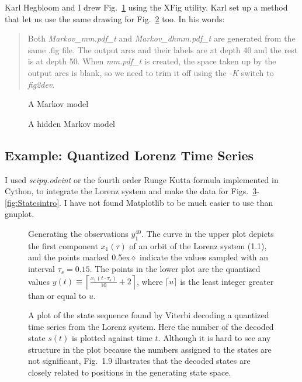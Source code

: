 \documentclass[prelim,showlabels]{book}
\newcommand{\Tsamp}{\tau_s }
\newcommand{\ceil}[1]{\lceil#1\rceil}
\newcommand{\bceil}[1]{\left\lceil#1\right\rceil}
\newcommand{\ti}[2]{{#1}{(#2)}}                  %
\newcommand{\ts}[3]{#1_{#2}^{#3}}                    %
\begin{document}
Karl Hegbloom and I drew Fig.~\ref{fig:mm} using the XFig utility.
Karl set up a method that let us use the same drawing for
Fig.~\ref{fig:dhmm} too.  In his words:
\begin{quote}
  Both \emph{Markov\_mm.pdf\_t} and \emph{Markov\_dhmm.pdf\_t} are
  generated from the same .fig file.  The output arcs and their labels
  are at depth 40 and the rest is at depth 50.  When \emph{mm.pdf\_t}
  is created, the space taken up by the output arcs is blank, so we
  need to trim it off using the \emph{-K} switch to \emph{fig2dev}.
\end{quote}

\begin{figure}[htbp]
  \centering{\resizebox{\textwidth}{!}{ }
  }
  \caption[A Markov model.]{A Markov model}
  \label{fig:mm}
\end{figure}

\begin{figure}[htbp]
  \centering{
  }
  \caption[A hidden Markov model.]{A hidden Markov model}
  \label{fig:dhmm}
\end{figure}

\subsection{Example: Quantized Lorenz Time Series}
\label{sec:QuantizedLorenz}

I used \emph{scipy.odeint} or the fourth order Runge Kutta formula
implemented in Cython, to integrate the Lorenz system and make the
data for Figs.~\ref{fig:TSintro}-\ref{fig:Statesintro}.  I have not
found Matplotlib to be much easier to use than gnuplot.
\begin{figure}[htbp]
  \caption[Generating the observations $\ts{y}{1}{40}$.]%
  {Generating the observations $\ts{y}{1}{40}$.  The curve in the
    upper plot depicts the first component $\ti{x_1}{\tau}$ of an
    orbit of the Lorenz system (1.1), and the points
    marked {\scriptsize\raise0.5ex\hbox{$\bm{\diamond}\!$}} indicate the
    values sampled with an interval $\Tsamp = 0.15$.  The points
    in the lower plot are the quantized values $\ti{y}{t} \equiv
    \bceil{\frac{\ti{x_1}{t \cdot \Tsamp}}{10} + 2}$, where
    $\ceil{u}$ is the least integer greater than or equal to $u$.  }
  \label{fig:TSintro}
\end{figure}

 \begin{figure}[htbp]
   \caption{A plot of the state sequence found by Viterbi decoding a quantized
     time series from the Lorenz system.  Here the number of the
     decoded state $\ti{s}{t}$ is plotted against time $t$.  Although
     it is hard to see any structure in the plot because the numbers
     assigned to the states are not significant,
     Fig.~1.9 illustrates that the decoded states
     are closely related to positions in the generating state space.}
   \label{fig:STSintro}
 \end{figure}
\end{document}
